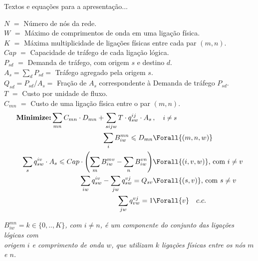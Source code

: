 

Textos e equa\c c\~oes para a apresenta\c c\~ao...

 \noindent$N$ $=$ N\'umero de n\'os da rede.\\
 $W$ $=$ M\'aximo de comprimentos de onda em uma liga\c c\~ao f\'isica.\\
 $K$ $=$ M\'axima multiplicidade de liga\c c\~oes f\'isicas entre cada par $(m,n)$.\\
 
\noindent $Cap$ $=$ Capacidade de tr\'afego de cada liga\c c\~ao l\'ogica.\\
 $P_{sd}$ $=$ Demanda de tr\'afego, com origem $s$ e destino $d$.\\
 $A_s = \sum_d P_{sd} =$ Tr\'afego agregado pela origem $s$. \\
 $Q_{sd}=P_{sd}/A_s =$ Fra\c c\~ao de $A_s$ correspondente \`a Demanda de tr\'afego $P_{sd}$.\\

  \noindent$T$ $=$ Custo por unidade de fluxo.\\
  $C_{mn}$ $=$ Custo de uma liga\c c\~ao f\'isica entre o par $(m,n)$.\\
 

$$
\begin{aligned}
\mbox{\textbf{Minimize:}}\sum_{mn} C_{mn}\cdot D_{mn} + \sum_{sijw} T\cdot q_{sw}^{ij}\cdot A_s \,&,\quad \mbox{\small$i\neq s$}\\
\sum_i B_{iw}^{mn} \leqslant D_{mn} &\Forall{(m,n,w)}\\
\sum_{s} q_{sw}^{iv}\cdot A_s \leqslant Cap\cdot \left(\sum_{m} B_{iw}^{mv} - \sum_{n} B_{iw}^{vn}\right) &\Forall{(i,v,w)} \mbox{, com $i\neq v$}\\
\sum_{iw} q_{sw}^{iv} - \sum_{jw} q_{sw}^{vj} = Q_{sv} &\Forall{(s,v)} \mbox{, com $s\neq v$}\\
\sum_{jw} q_{vw}^{vj} = 1 &\Forall{v} \quad c.c.
\end{aligned}
$$

{\noindent \begin{flushright}\emph{
     $B_{iw}^{mn} = k\in \{0,..,K\}$, com $i\neq n$, \'e um componente do conjunto das liga\c c\~oes l\'ogicas com \\
     origem $i$ e comprimento de onda $w$, que utilizam $k$ liga\c c\~oes f\'isicas entre os n\'os $m$ e $n$.
}\end{flushright}}
 
